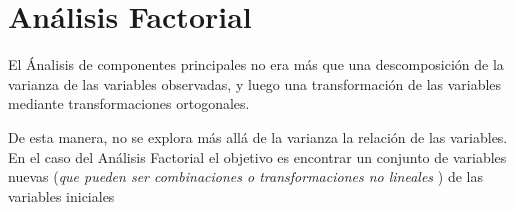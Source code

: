 \section{Análisis Factorial}
\noindent El Ánalisis de componentes principales no era más que una descomposición de la varianza de las variables observadas, y luego una transformación de las variables mediante transformaciones ortogonales. 

\noindent De esta manera, no se explora más allá de la varianza la relación de las variables. En el caso del Análisis Factorial el objetivo es encontrar un conjunto de variables nuevas (\emph{que pueden ser combinaciones o transformaciones no lineales }) de las variables iniciales